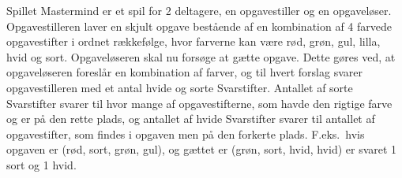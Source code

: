 Spillet Mastermind er et spil for 2 deltagere, en opgavestiller og en opgaveløser. Opgavestilleren laver en skjult opgave bestående af en kombination af 4 farvede opgavestifter i ordnet rækkefølge, hvor farverne kan være rød, grøn, gul, lilla, hvid og sort. Opgaveløseren skal nu forsøge at gætte opgave. Dette gøres ved, at opgaveløseren foreslår en kombination af farver, og til hvert forslag svarer opgavestilleren med et antal hvide og sorte Svarstifter. Antallet af sorte Svarstifter svarer til hvor mange af opgavestifterne, som havde den rigtige farve og er på den rette plads, og antallet af hvide Svarstifter svarer til antallet af opgavestifter, som findes i opgaven men på den forkerte plads. F.eks.\ hvis opgaven er (rød, sort, grøn, gul), og gættet er (grøn, sort, hvid, hvid) er svaret 1 sort og 1 hvid.